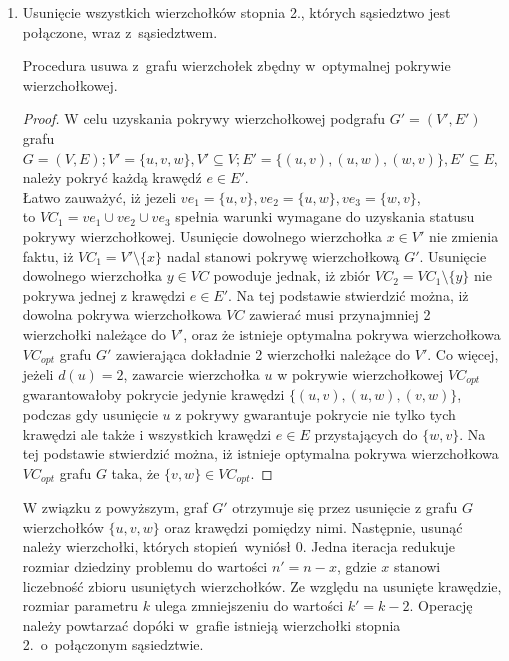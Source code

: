\begin{enumerate}
  \item Usunięcie wszystkich wierzchołków stopnia 2., których sąsiedztwo jest
    połączone, wraz z~sąsiedztwem.   
    \begin{theorem}
      Procedura usuwa z~grafu wierzchołek zbędny w~optymalnej pokrywie
      wierzchołkowej.
    \end{theorem}
    \begin{proof}
      W celu uzyskania pokrywy wierzchołkowej podgrafu $G\prime=(V\prime,E\prime)$
      grafu ${G=(V,E); V\prime=\{u, v, w\}, V\prime \subseteq V; E\prime=\{(u,v),
      (u,w), (w,v)\}, E\prime \subseteq E}$, należy pokryć każdą krawędź $e \in
      E\prime$.\\ 
      Łatwo zauważyć, iż jezeli ${ve_1=\{u,v\}, ve_2=\{u,w\}, ve_3=\{w,v\}}$,\\ 
      to ${VC_1=ve_1 \cup ve_2 \cup ve_3}$ spełnia warunki wymagane do uzyskania 
      statusu pokrywy wierzchołkowej.
      Usunięcie dowolnego wierzchołka $x \in V\prime$ nie zmienia faktu, iż 
      ${VC_1=V\prime \setminus \{x\}}$ nadal stanowi pokrywę wierzchołkową
      $G\prime$.
      Usunięcie dowolnego wierzchołka $y \in VC$ powoduje jednak, iż zbiór
      $VC_2=VC_1 \setminus \{y\}$ nie pokrywa jednej z krawędzi $e \in E\prime$.
      Na tej podstawie stwierdzić można, iż dowolna pokrywa wierzchołkowa
      $VC$ zawierać musi przynajmniej 2 wierzchołki należące do $V\prime$, oraz
      że istnieje optymalna pokrywa wierzchołkowa $VC_{opt}$ grafu $G\prime$
      zawierająca dokładnie 2 wierzchołki należące do $V\prime$.
      Co więcej, jeżeli $d(u)=2$, zawarcie wierzchołka $u$ w pokrywie
      wierzchołkowej $VC_{opt}$ gwarantowałoby pokrycie jedynie krawędzi
      $\{(u,v), (u,w), (v,w)\}$, podczas gdy usunięcie $u$ z pokrywy gwarantuje 
      pokrycie nie tylko tych krawędzi ale także i wszystkich krawędzi $e \in E$
      przystających do $\{w, v\}$.
      Na tej podstawie stwierdzić można, iż istnieje optymalna pokrywa
      wierzchołkowa $VC_{opt}$ grafu $G$ taka, że $\{v,w\} \in VC_{opt}$.
    \end{proof}
    W związku z powyższym, graf $G\prime$ otrzymuje się przez usunięcie z grafu
    $G$ wierzchołków $\{u,v,w\}$ oraz krawędzi pomiędzy nimi.
    Następnie, usunąć należy wierzchołki, których stopień wyniósł 0.
    Jedna iteracja redukuje rozmiar dziedziny problemu do wartości
    $n\prime=n-x$, gdzie $x$ stanowi liczebność zbioru usuniętych wierzchołków.
    Ze względu na usunięte krawędzie, rozmiar parametru $k$ ulega zmniejszeniu 
    do wartości $k\prime=k-2$.
    Operację należy powtarzać dopóki w~grafie istnieją wierzchołki stopnia 2.\
    o~połączonym sąsiedztwie.


\end{enumerate}
